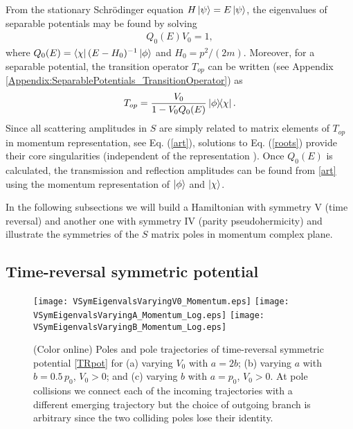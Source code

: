 From the stationary Schr\"{o}dinger equation $H \ket{\psi} = E \ket{\psi}$, the eigenvalues of separable potentials may be found by solving
%
\begin{eqnarray}
Q_{0}(E)V_{0} = 1,
\label{roots}
\end{eqnarray}
%
where $Q_{0}(E)=\bra{\chi}(E-H_0)^{-1}\ket{\phi}$ and $H_{0}=p^{2}/(2m)$. Moreover, for a separable potential, the transition operator $T_{op}$ can be written (see Appendix \ref{Appendix:SeparablePotentials_TransitionOperator}) as
%
\begin{equation}
T_{op}=\frac{V_{0}}{1-V_{0} Q_{0}(E)} \ketbra{\phi}{\chi}.
\end{equation}
%
Since all scattering amplitudes in $S$ are simply related to matrix elements of $T_{op}$ in momentum representation, see
Eq. (\ref{art}), solutions to Eq. (\ref{roots}) provide their core singularities (independent of the representation \cite{Muga1996}).
Once $Q_{0}(E)$  is calculated, the transmission and reflection amplitudes can be found from \eqref{art}
using the momentum representation of $\ket{\phi}$ and $\ket{\chi}$.

In the following subsections we will build a Hamiltonian with symmetry V (time reversal) and another one with symmetry IV
(parity pseudohermicity) and illustrate the symmetries of the $S$ matrix poles in momentum complex plane.

%
\subsection{Time-reversal symmetric potential}
%
%
\begin{figure}[h]
    \texttt{[image: VSymEigenvalsVaryingV0\_Momentum.eps]}
    \texttt{[image: VSymEigenvalsVaryingA\_Momentum\_Log.eps]}
    \texttt{[image: VSymEigenvalsVaryingB\_Momentum\_Log.eps]}
    \caption{(Color online) Poles and pole trajectories of time-reversal symmetric potential \eqref{TRpot} for (a) varying $V_0$ with $a=2 b$; (b) varying $a$ with $b=0.5\, p_0$, $V_0>0$; and (c) varying $b$ with $a=p_0$,
    $V_0>0$. At pole collisions we connect each of the incoming trajectories with a different emerging trajectory but the choice of outgoing branch  is arbitrary since the two colliding poles lose their identity.}
    \label{fig:VSymEigenvals}
\end{figure}

